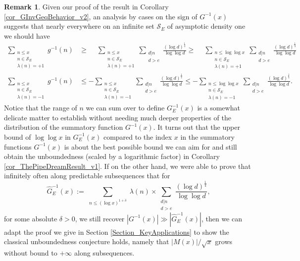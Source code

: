 \documentclass[11pt,reqno,a4letter]{article}
\numberwithin{figure}{section}
\numberwithin{table}{section}
\theoremstyle{plain}
\numberwithin{theorem}{section}
\theoremstyle{definition}
\newtheorem{remark}[theorem]{Remark}
\begin{document}
\begin{remark} 
Given our proof of the result in Corollary \ref{cor_GInvGeqBehavior_v2}, an analysis 
by cases on the sign of $G^{-1}(x)$ suggests that nearly everywhere on an infinite set 
$\mathcal{S}_E$ of asymptotic density one we should have 
\begin{align*} 
\sum_{\substack{n \leq x \\ n \in \mathcal{S}_E \\ \lambda(n) = +1}} g^{-1}(n) & \geq 
     \phantom{-} \sum_{\substack{n \leq x \\ n \in \mathcal{S}_E \\ \lambda(n) = +1}} 
     \sum_{\substack{d|n \\ d > e}} \frac{(\log d)^{\frac{1}{4}}}{\log\log d} \geq \phantom{-} 
     \sum_{\substack{n \leq \log\log x \\ n \in \mathcal{S}_E \\ \lambda(n) = +1}} 
     \sum_{\substack{d|n \\ d > e}} \frac{(\log d)^{\frac{1}{4}}}{\log\log d} \\ 
\sum_{\substack{n \leq x \\ n \in \mathcal{S}_E \\ \lambda(n) = -1}} g^{-1}(n) & \leq 
     -\sum_{\substack{n \leq x \\ n \in \mathcal{S}_E \\ \lambda(n) = -1}}
     \sum_{\substack{d|n \\ d > e}} \frac{(\log d)^{\frac{1}{4}}}{\log\log d} \leq 
     -\sum_{\substack{n \leq \log\log x \\ n \in \mathcal{S}_E \\ \lambda(n) = -1}}
     \sum_{\substack{d|n \\ d > e}} \frac{(\log d)^{\frac{1}{4}}}{\log\log d}. 
\end{align*} 
Notice that the range of $n$ we can sum over to 
define $G_E^{-1}(x)$ is a somewhat delicate matter to establish without needing much 
deeper properties of the distribution of the summatory function $G^{-1}(x)$. It turns out that 
the upper bound of $\log\log x$ in $G_E^{-1}(x)$ compared to the index $x$ in the 
summatory functions $G^{-1}(x)$ is about the best possible bound we can aim for and still obtain 
the unboundedness (scaled by a logarithmic factor) in 
Corollary \ref{cor_ThePipeDreamResult_v1}. 
If on the other hand, we were able to prove that infinitely often along predictable 
subsequences that for 
\[
\widehat{G}_E^{-1}(x) := \sum_{\substack{n \leq (\log x)^{1+\delta}}} \lambda(n) \times 
     \sum_{\substack{d|n \\ d > e}} \frac{(\log d)^{\frac{1}{4}}}{\log\log d}, 
\]
for some absolute $\delta > 0$, 
we still recover $|G^{-1}(x)| \gg |\widehat{G}_E^{-1}(x)|$, then we can adapt the proof we give 
in Section \ref{Section_KeyApplications} to show the classical unboundedness conjecture holds, namely that 
$|M(x)| / \sqrt{x}$ grows without bound to $+\infty$ along subsequences. 
\end{remark} 
\end{document}
